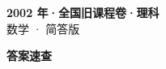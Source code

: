 \documentclass[zihao=-4, a4paper]{ctexart}
\begin{document}
\begin{center}
  {\Large\bfseries 2002 年·全国旧课程卷·理科}\\[4pt]
  {\large 数学 · 简答版}
\end{center}
\medskip
{}

\clearpage
{}
\begin{center}{\Large\bfseries 答案速查}\end{center}
\medskip

\end{document}
